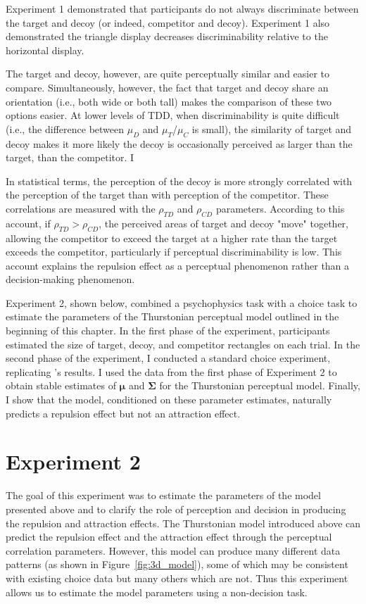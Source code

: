 Experiment 1 demonstrated that participants do not always discriminate between the target and decoy (or indeed, competitor and decoy). Experiment 1 also demonstrated the triangle display decreases discriminability relative to the horizontal display.

The target and decoy, however, are quite perceptually similar and easier to compare. Simultaneously, however, the fact that target and decoy share an orientation (i.e., both wide or both tall) makes the comparison of these two options easier. At lower levels of TDD, when discriminability is quite difficult (i.e., the difference between $\mu_{D}$ and $\mu_{T}$/$\mu_{C}$ is small), the similarity of target and decoy makes it more likely the decoy is occasionally perceived as larger than the target, than the competitor. I

In statistical terms, the perception of the decoy is more strongly correlated with the perception of the target than with perception of the competitor. These correlations are measured with the $\rho_{TD}$ and $\rho_{CD}$ parameters. According to this account, if $\rho_{TD}>\rho_{CD}$, the perceived areas of target and decoy "move" together, allowing the competitor to exceed the target at a higher rate than the target exceeds the competitor, particularly if perceptual discriminability is low. This account explains the repulsion effect as a perceptual phenomenon rather than a decision-making phenomenon.

Experiment 2, shown below, combined a psychophysics task with a choice task to estimate the parameters of the Thurstonian perceptual model outlined in the beginning of this chapter. In the first phase of the experiment, participants estimated the size of target, decoy, and competitor rectangles on each trial. In the second phase of the experiment, I conducted a standard choice experiment, replicating \textcite{spektorWhenGoodLooks2018b}'s results. I used the data from the first phase of Experiment 2 to obtain stable estimates of  $\boldsymbol{\mu}$ and $\boldsymbol{\Sigma}$ for the Thurstonian perceptual model. Finally, I show that the model, conditioned on these parameter estimates, naturally predicts a repulsion effect but not an attraction effect.  

\section{Experiment 2}
The goal of this experiment was to estimate the parameters of the model presented above and to clarify the role of perception and decision in producing the repulsion and attraction effects. The Thurstonian model introduced above can predict the repulsion effect and the attraction effect through the perceptual correlation parameters. However, this model can produce many different data patterns (as shown in Figure~\ref{fig:3d_model}), some of which may be consistent with existing choice data but many others which are not. Thus this experiment allows us to estimate the model parameters using a non-decision task.

